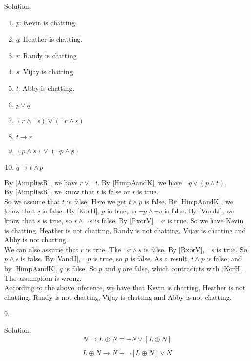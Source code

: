 \documentclass[12pt]{article}
\begin{document}
\indent Solution:\\
\begin{enumerate}
\item \label{Kchat} $p$: Kevin is chatting.
\item \label{Hchat} $q$: Heather is chatting.
\item \label{Rchat} $r$: Randy is chatting.
\item \label{Vchat} $s$: Vijay is chatting.
\item \label{Achat} $t$: Abby is chatting.
\item \label{KorH} $p \lor q$
\item \label{RxorV} $(r \land \lnot s) \lor (\lnot r \land s)$
\item \label{AimpliesR} $t \to r$
\item \label{VandJ} $(p \land s) \lor (\lnot p \land \not s)$
\item \label{HimpAandK} $q \to t \land p$
\end{enumerate}

By \ref{AimpliesR}, we have $r \lor \lnot t$. By \ref{HimpAandK}, we have $\lnot q \lor (p \land t)$.\\
\indent By \ref{AimpliesR}, we know that $t$ is false or $r$ is true. \\ 
\indent So we assume that $t$ is false. Here we get $t \land p$ is false. By \ref{HimpAandK}, we know that $q$ is false. By \ref{KorH}, $p$ is true, so $\lnot p \land \lnot s$ is false. By \ref{VandJ}, we know that $s$ is true, so $r \land \lnot s$ is false. By \ref{RxorV}, $\lnot r$ is true. So we have Kevin is chatting, Heather is not chatting, Randy is not chatting, Vijay is chatting and Abby is not chatting.\\ 
\indent We can also assume that $r$ is true. The $\lnot r \land s$ is false. By \ref{RxorV}, $\lnot s$ is true. So $p \land s$ is false. By \ref{VandJ}, $\lnot p$ is true, so $p$ is false. As a result, $t \land p$ is false, and by \ref{HimpAandK}, $q$ is false. So $p$ and $q$ are false, which contradicts with \ref{KorH}. The assumption is wrong.\\
\indent According to the above inference, we have that Kevin is chatting, Heather is not chatting, Randy is not chatting, Vijay is chatting and Abby is not chatting.
\newline

9. 

\indent Solution:\\
\begin{align*}
N \to L \oplus N \equiv \lnot N \lor [L \oplus N]\\ 
\end{align*}
\begin{align*}
L \oplus N \to N \equiv \lnot [L \oplus N] \lor N \\
\end{align*}
\end{document}
